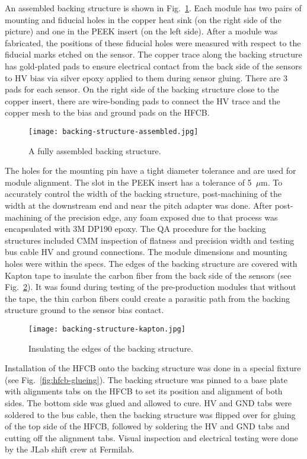 An assembled backing structure is shown in Fig.~\ref{fig:backing-structure-assembled}. Each module has two pairs of mounting and fiducial holes in the copper heat sink (on the right side of the picture) and one in the PEEK insert (on the left side). After a module was fabricated, the positions of these fiducial holes were measured with respect to the fiducial marks etched on the sensor. The copper trace along the backing structure has gold-plated pads to ensure electrical contact from the back side of the sensors to HV bias via silver epoxy applied to them during sensor gluing. There are 3 pads for each sensor. On the right side of the backing structure close to the copper insert, there are wire-bonding pads to connect the HV trace and the copper mesh to the bias and ground pads on the HFCB.

\begin{figure}[hbt] 
\centering 
\texttt{[image: backing-structure-assembled.jpg]}
\caption{A fully assembled backing structure.}
\label{fig:backing-structure-assembled}
\end{figure}

The holes for the mounting pin have a tight diameter tolerance and are used for module alignment. The slot in the PEEK insert has a tolerance of 5~$\mu$m. To accurately control the width of the backing structure, post-machining of the width at the downstream end and near the pitch adapter was done. After post-machining of the precision edge, any foam exposed due to that process was encapsulated with 3M DP190 epoxy. The QA procedure for the backing structures included CMM inspection of flatness and precision width and testing bus cable HV and ground connections. The module dimensions and mounting holes were within the specs. The edges of the backing structure are covered with Kapton tape to insulate the carbon fiber from the back side of the sensors (see Fig.~\ref{fig:backing-structure-kapton}). It was found during testing of the pre-production modules that without the tape, the thin carbon fibers could create a parasitic path from the backing structure ground to the sensor bias contact.

\begin{figure}[hbt] 
\centering 
\texttt{[image: backing-structure-kapton.jpg]}
\caption{Insulating the edges of the backing structure.}
\label{fig:backing-structure-kapton}
\end{figure}

Installation of the HFCB onto the backing structure was done in a special fixture (see Fig.~\ref{fig:hfcb-glueing}). The backing structure was pinned to a base plate with alignments tabs on the HFCB to set its position and alignment of both sides. The bottom side was glued and allowed to cure. HV and GND tabs were soldered to the bus cable, then the backing structure was flipped over for gluing of the top side of the HFCB, followed by soldering the HV and GND tabs and cutting off the alignment tabs. Visual inspection and electrical testing were done by the JLab shift crew at Fermilab.

